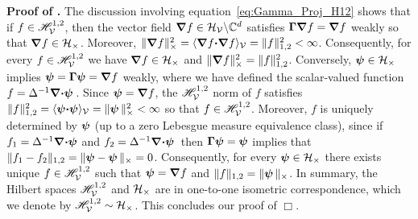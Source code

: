 \documentclass[amsa]{ipart}
\begin{document}
\textbf{Proof of .}\hspace{1ex}
%
The discussion involving equation~\eqref{eq:Gamma_Proj_H12} shows that 
if $f\in\Hs^{1,2}_{\Vc}$, then the vector field $\bnabla f\in\Hc_{\Vc}\backslash\mathbb{C}^d$
satisfies $\bGamma\bnabla f=\bnabla f$ 
weakly so that $\bnabla f\in\Hc_\times$. Moreover,
$\|\bnabla f\|_\times^2=\langle\bnabla f\bcdot\bnabla
f\rangle_{\Vc}=\|f\|_{1,2}^2<\infty$. Consequently, for every    
$f\in\Hs^{1,2}_{\Vc}$ we have $\bnabla f\in\Hc_\times$ and $\|\bnabla
f\|_\times^2=\|f\|_{1,2}^2$. Conversely, $\vecpsi\in\Hc_\times$ implies 
$\vecpsi=\bGamma\vecpsi=\bnabla f$ weakly, where we have defined the
scalar-valued function $f=\Delta^{-1}\bnabla \bcdot\vecpsi\,$. Since
$\vecpsi=\bnabla f$, the 
$\Hs^{1,2}_{\Vc}$ norm of $f$ satisfies
$\|f\|_{1,2}^2=\langle\vecpsi\bcdot\vecpsi\rangle_{\Vc}=\|\vecpsi\,\|_\times^2<\infty$ so that
$f\in\Hs^{1,2}_{\Vc}$. Moreover, $f$ is uniquely determined by $\vecpsi$ (up
to a zero Lebesgue measure equivalence class), since if $f_1=\Delta^{-1}\bnabla
\bcdot\vecpsi$ and $f_2=\Delta^{-1}\bnabla \bcdot\vecpsi\,$ then
$\bGamma\vecpsi=\vecpsi$ implies that
$\|f_1-f_2\|_{1,2}=\|\vecpsi-\vecpsi\,\|_\times=0$. Consequently, for every
$\vecpsi\in\Hc_\times$ there exists unique $f\in\Hs^{1,2}_{\Vc}$ such that
$\vecpsi=\bnabla f$ and $\|f\|_{1,2}=\|\vecpsi\,\|_\times$.  In summary, the
Hilbert spaces $\Hs^{1,2}_{\Vc}$ and $\Hc_\times$ are in one-to-one
isometric correspondence, which we denote by
$\Hs^{1,2}_{\Vc}\sim\Hc_\times$. This concludes our proof of
 $\Box$.
\end{document}
